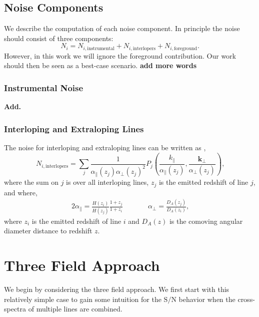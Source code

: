 \documentclass{aastex62}
\newcommand{\beq}{\begin{equation}}
\newcommand{\eeq}{\end{equation}}
\newcommand{\kpar}{k_{\parallel}}
\newcommand{\kperp}{\bm{k}_{\perp}}
\newcommand{\apar}{\alpha_{\parallel}}
\newcommand{\aperp}{\alpha_{\perp}}
\newcommand{\SN}{\ensuremath{\text{S}/\text{N}}}
\begin{document}
\subsection{Noise Components}\label{ssec:noise}
We describe the computation of each noise component. In principle the noise
should consist of three components:
\beq\label{eq:noise_comp}
N_i = N_{i,\text{instrumental}} + N_{i,\text{interlopers}} + N_{i,\text{foreground}}\text{.}
\eeq
However, in this work we will ignore the foreground contribution. Our work
should then be seen as a best-case scenario. {\bf add more words}

\subsubsection{Instrumental Noise}\label{sssec:instrumental}
{\bf Add.}

\subsubsection{Interloping and Extraloping Lines}\label{sssec:interlopers}
The noise for interloping and extraloping lines can be written as
\citep{2016ApJ...825..143L, 2016ApJ...832..165C},
\beq\label{eq:ptot_intlpr}
N_{i,\text{interlopers}} = \sum_{j} \frac{1}{\apar(z_j) \aperp(z_j)^2} 
            P_j\left(\frac{\kpar}{\apar(z_j)}, 
                     \frac{\kperp}{\aperp(z_j)}\right)\text{,}
\eeq
where the sum on $j$ is over all interloping lines, $z_j$ is the
emitted redshift of line $j$, and where,
\begin{alignat}{2}
\apar = \frac{H(z_i)}{H(z_j)} \frac{1+z_j}{1+z_i} \quad \quad &&
\aperp = \frac{D_{A}(z_j)}{D_A(z_i)}\text{,}
\end{alignat}
where $z_i$ is the emitted redshift of line $i$ and $D_A(z)$ is the comoving
angular diameter distance to redshift $z$.

\section{Three Field Approach}\label{sec:tf}
We begin by considering the three field approach. We first start with this
relatively simple case to gain some intuition for the \SN{} behavior when the
cross-spectra of multiple lines are combined.
\end{document}
